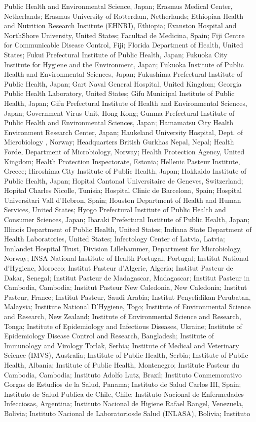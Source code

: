 \documentclass[9pt,lineno]{elife} %
\begin{document}
\begin{appendixbox}
Public Health and Environmental Science, Japan; Erasmus Medical Center, Netherlands; Erasmus University of Rotterdam, Netherlands; Ethiopian Health and Nutrition Research Institute (EHNRI), Ethiopia; Evanston Hospital and NorthShore University, United States; Facultad de Medicina, Spain; Fiji Centre for Communicable Disease Control, Fiji; Florida Department of Health, United States; Fukui Prefectural Institute of Public Health, Japan; Fukuoka City Institute for Hygiene and the Environment, Japan; Fukuoka Institute of Public Health and Environmental Sciences, Japan; Fukushima Prefectural Institute of Public Health, Japan; Gart Naval General Hospital, United Kingdom; Georgia Public Health Laboratory, United States; Gifu Municipal Institute of Public Health, Japan; Gifu Prefectural Institute of Health and Environmental Sciences, Japan; Government Virus Unit, Hong Kong; Gunma Prefectural Institute of Public Health and Environmental Sciences, Japan; Hamamatsu City Health Environment Research Center, Japan; Haukeland University Hospital, Dept. of Microbiology , Norway; Headquarters British Gurkhas Nepal, Nepal; Health Forde, Department of Microbiology, Norway; Health Protection Agency, United Kingdom; Health Protection Inspectorate, Estonia; Hellenic Pasteur Institute, Greece; Hiroshima City Institute of Public Health, Japan; Hokkaido Institute of Public Health, Japan; Hopital Cantonal Universitaire de Geneves, Switzerland; Hopital Charles Nicolle, Tunisia; Hospital Clinic de Barcelona, Spain; Hospital Universitari Vall d'Hebron, Spain; Houston Department of Health and Human Services, United States; Hyogo Prefectural Institute of Public Health and Consumer Sciences, Japan; Ibaraki Prefectural Institute of Public Health, Japan; Illinois Department of Public Health, United States; Indiana State Department of Health Laboratories, United States; Infectology Center of Latvia, Latvia; Innlandet Hospital Trust, Division Lillehammer, Department for Microbiology, Norway; INSA National Institute of Health Portugal, Portugal; Institut National d'Hygiene, Morocco; Institut Pasteur d'Algerie, Algeria; Institut Pasteur de Dakar, Senegal; Institut Pasteur de Madagascar, Madagascar; Institut Pasteur in Cambodia, Cambodia; Institut Pasteur New Caledonia, New Caledonia; Institut Pasteur, France; Institut Pasteur, Saudi Arabia; Institut Penyelidikan Perubatan, Malaysia; Institute National D'Hygiene, Togo; Institute of Environmental Science and Research, New Zealand; Institute of Environmental Science and Research, Tonga; Institute of Epidemiology and Infectious Diseases, Ukraine; Institute of Epidemiology Disease Control and Research, Bangladesh; Institute of Immunology and Virology Torlak, Serbia; Institute of Medical and Veterinary Science (IMVS), Australia; Institute of Public Health, Serbia; Institute of Public Health, Albania; Institute of Public Health, Montenegro; Institute Pasteur du Cambodia, Cambodia; Instituto Adolfo Lutz, Brazil; Instituto Conmemorativo Gorgas de Estudios de la Salud, Panama; Instituto de Salud Carlos III, Spain; Instituto de Salud Publica de Chile, Chile; Instituto Nacional de Enfermedades Infecciosas, Argentina; Instituto Nacional de Higiene Rafael Rangel, Venezuela, Bolivia; Instituto Nacional de Laboratoriosde Salud (INLASA), Bolivia; Instituto 
\end{appendixbox}
\end{document}
